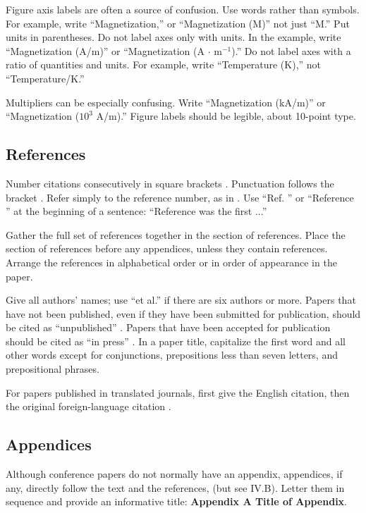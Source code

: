 \documentclass[conference,a4paper]{APSIPA2026}
\begin{document}
Figure axis labels are often a source of confusion.
Use words rather than symbols.
For example, write ``Magnetization,'' or ``Magnetization (M)'' not just ``M.''  Put units in parentheses.
Do not label axes only with units.
In the example, write ``Magnetization (A/m)'' or ``Magnetization (A $\cdot$ m$^{-1}$).''
Do not label axes with a ratio of quantities and units.
For example, write ``Temperature (K),'' not ``Temperature/K.''

Multipliers can be especially confusing.
Write ``Magnetization (kA/m)'' or ``Magnetization ($10^3$ A/m).''
Figure labels should be legible, about 10-point type.

\subsection{References}
Number citations consecutively in square brackets \cite{eason1955certain}.
Punctuation follows the bracket \cite{maxwell1873treatise}.
Refer simply to the reference number, as in \cite{jacobs1963fine}.
Use ``Ref. \cite{jacobs1963fine}'' or ``Reference \cite{jacobs1963fine}'' at the beginning of a sentence: ``Reference \cite{jacobs1963fine} was the first ...''

Gather the full set of references together in the section of references.
Place the section of references before any appendices, unless they contain references.
Arrange the references in alphabetical order or in order of appearance in the paper.

Give all authors' names; use ``et al.''  if there are six authors or more.
Papers that have not been published, even if they have been submitted for publication, should be cited as ``unpublished'' \cite{title_of_paper_if_known}.
Papers that have been accepted for publication should be cited as ``in press'' \cite{title_of_paper_with_only_first_word_capitalized}.
In a paper title, capitalize the first word and all other words except for conjunctions, prepositions less than seven letters, and prepositional phrases.

For papers published in translated journals, first give the English citation, then the original foreign-language citation \cite{4549593}.

\subsection{Appendices}
Although conference papers do not normally have an appendix, appendices, if any, directly follow the text and the references, (but see IV.B).
Letter them in sequence and provide an informative title: {\bf Appendix A Title of Appendix}.
\end{document}
